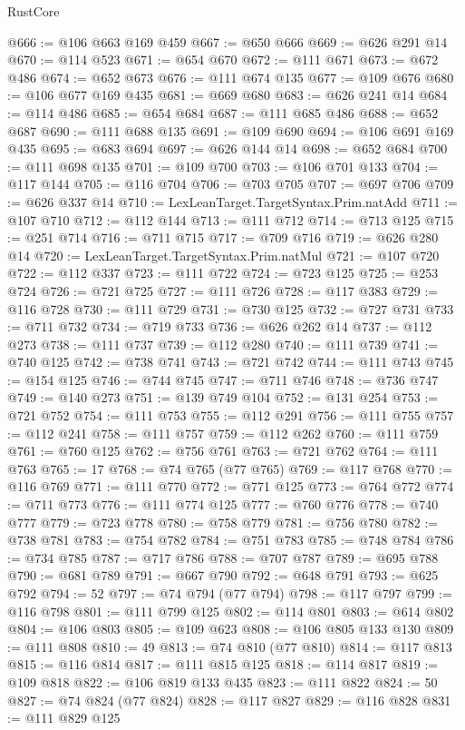 \begin{lexlean}{RustCore}
\begin{coremodule}
@666 := @106 @663 @169 @459
@667 := @650 @666
@669 := @626 @291 @14
@670 := @114 @523
@671 := @654 @670
@672 := @111 @671
@673 := @672 @486
@674 := @652 @673
@676 := @111 @674 @135
@677 := @109 @676
@680 := @106 @677 @169 @435
@681 := @669 @680
@683 := @626 @241 @14
@684 := @114 @486
@685 := @654 @684
@687 := @111 @685 @486
@688 := @652 @687
@690 := @111 @688 @135
@691 := @109 @690
@694 := @106 @691 @169 @435
@695 := @683 @694
@697 := @626 @144 @14
@698 := @652 @684
@700 := @111 @698 @135
@701 := @109 @700
@703 := @106 @701 @133
@704 := @117 @144
@705 := @116 @704
@706 := @703 @705
@707 := @697 @706
@709 := @626 @337 @14
@710 := LexLeanTarget.TargetSyntax.Prim.natAdd
@711 := @107 @710
@712 := @112 @144
@713 := @111 @712
@714 := @713 @125
@715 := @251 @714
@716 := @711 @715
@717 := @709 @716
@719 := @626 @280 @14
@720 := LexLeanTarget.TargetSyntax.Prim.natMul
@721 := @107 @720
@722 := @112 @337
@723 := @111 @722
@724 := @723 @125
@725 := @253 @724
@726 := @721 @725
@727 := @111 @726
@728 := @117 @383
@729 := @116 @728
@730 := @111 @729
@731 := @730 @125
@732 := @727 @731
@733 := @711 @732
@734 := @719 @733
@736 := @626 @262 @14
@737 := @112 @273
@738 := @111 @737
@739 := @112 @280
@740 := @111 @739
@741 := @740 @125
@742 := @738 @741
@743 := @721 @742
@744 := @111 @743
@745 := @154 @125
@746 := @744 @745
@747 := @711 @746
@748 := @736 @747
@749 := @140 @273
@751 := @139 @749 @104
@752 := @131 @254
@753 := @721 @752
@754 := @111 @753
@755 := @112 @291
@756 := @111 @755
@757 := @112 @241
@758 := @111 @757
@759 := @112 @262
@760 := @111 @759
@761 := @760 @125
@762 := @756 @761
@763 := @721 @762
@764 := @111 @763
@765 := 17
@768 := @74 @765 (@77 @765)
@769 := @117 @768
@770 := @116 @769
@771 := @111 @770
@772 := @771 @125
@773 := @764 @772
@774 := @711 @773
@776 := @111 @774 @125
@777 := @760 @776
@778 := @740 @777
@779 := @723 @778
@780 := @758 @779
@781 := @756 @780
@782 := @738 @781
@783 := @754 @782
@784 := @751 @783
@785 := @748 @784
@786 := @734 @785
@787 := @717 @786
@788 := @707 @787
@789 := @695 @788
@790 := @681 @789
@791 := @667 @790
@792 := @648 @791
@793 := @625 @792
@794 := 52
@797 := @74 @794 (@77 @794)
@798 := @117 @797
@799 := @116 @798
@801 := @111 @799 @125
@802 := @114 @801
@803 := @614 @802
@804 := @106 @803
@805 := @109 @623
@808 := @106 @805 @133 @130
@809 := @111 @808
@810 := 49
@813 := @74 @810 (@77 @810)
@814 := @117 @813
@815 := @116 @814
@817 := @111 @815 @125
@818 := @114 @817
@819 := @109 @818
@822 := @106 @819 @133 @435
@823 := @111 @822
@824 := 50
@827 := @74 @824 (@77 @824)
@828 := @117 @827
@829 := @116 @828
@831 := @111 @829 @125

\end{coremodule}
\end{lexlean}
